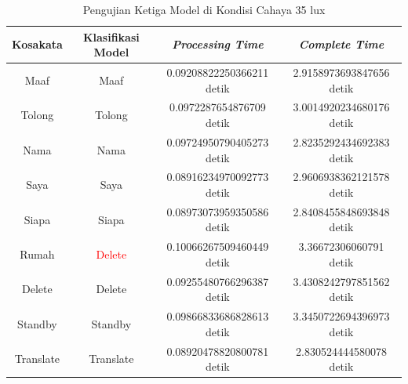 \begin{longtable}{|c|c|c|c|}
  \caption{Pengujian Ketiga Model di Kondisi Cahaya 35 lux}
  \label{tb:prediksigelap3}                                   \\
  \hline
  \rowcolor[HTML]{C0C0C0}
  \textbf{Kosakata} & \textbf{Klasifikasi Model} & \textbf{\emph{Processing Time}} & \textbf{\emph{Complete Time}}\\
  \hline
  Maaf              & Maaf                          & 0.09208822250366211 detik                           & 2.9158973693847656 detik                                  \\
  Tolong            & Tolong                        & 0.0972287654876709 detik                            & 3.0014920234680176 detik                                  \\
  Nama              & Nama                          & 0.09724950790405273 detik                           & 2.8235292434692383 detik                                  \\
  Saya              & Saya                          & 0.08916234970092773 detik                           & 2.9606938362121578 detik                                  \\
  Siapa             & Siapa                         & 0.08973073959350586 detik                           & 2.8408455848693848 detik                                  \\
  Rumah             & \textcolor{red}{Delete}       & 0.10066267509460449 detik                           & 3.36672306060791 detik                                \\
  Delete            & Delete                        & 0.09255480766296387 detik                           & 3.4308242797851562 detik                                  \\
  Standby           & Standby                       & 0.09866833686828613 detik                           & 3.3450722694396973 detik                                  \\
  Translate         & Translate                     & 0.08920478820800781 detik                           & 2.830524444580078 detik                                 \\
  \hline
\end{longtable}

